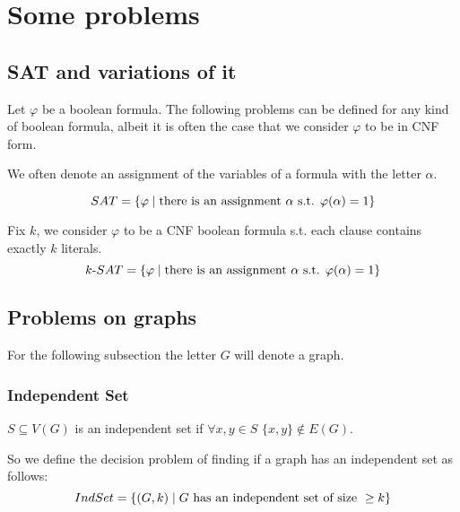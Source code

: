\section{Some problems}\label{sec:some_problems}

\subsection{SAT and variations of it}\label{subsec:problem_sat}

    Let $\varphi$ be a boolean formula. The following problems can be defined for any kind of boolean formula, albeit it is often the case that we consider $\varphi$ to be in CNF form.

    We often denote an assignment of the variables of a formula with the letter $\alpha$.

    \begin{definition}[SAT]\label{def:sat}
        \[ SAT = \{ \varphi \; \vert \; \text{there is an assignment } \alpha \text{ s.t. } \varphi(\alpha) = 1 \} \]    
    \end{definition}

    \begin{definition}[$k$-SAT]\label{def:k_sat}
        Fix $k$, we consider $\varphi$ to be a CNF boolean formula s.t. each clause contains exactly $k$ literals.
        \[ k\text{-}SAT = \{ \varphi \; \vert \; \text{there is an assignment } \alpha \text{ s.t. } \varphi(\alpha) = 1 \} \]  
    \end{definition}

    


\subsection{Problems on graphs}\label{subsec:problem_graphs}

    For the following subsection the letter $G$ will denote a graph.

    \subsubsection{Independent Set}\label{subsubsec:problem_indset}
        \begin{definition}\label{def:ind_set}
            $S \subseteq V(G)$ is an independent set if $\forall x,y \in S$ $\{ x,y \} \not\in E(G)$.
        \end{definition}

        So we define the decision problem of finding if a graph has an independent set as follows:
        \[ IndSet = \{ (G,k) \; \vert \; G  \text{ has an independent set of size } \geq k \} \]

